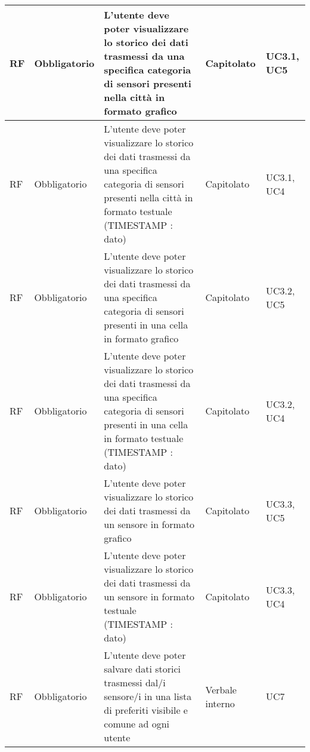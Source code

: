 \begin{longtable}{|C{1cm}|C{2cm}|>{\raggedright}m{5cm}|C{2cm}|C{1.5cm}|}
    \hline
     RF & Obbligatorio        & L'utente deve poter visualizzare lo storico dei dati trasmessi da una specifica categoria di sensori presenti nella città in formato grafico                                                                                       & Capitolato      & UC3.1, UC5               \\
    \hline
     RF & Obbligatorio        & L'utente deve poter visualizzare lo storico dei dati trasmessi da una specifica categoria di sensori presenti nella \newline città in formato testuale (TIMESTAMP : dato)                                                          & Capitolato & UC3.1, UC4                   \\
    \hline
     RF & Obbligatorio        & L'utente deve poter visualizzare lo storico dei dati trasmessi da una specifica categoria di sensori presenti in una cella in formato grafico                                                                                      & Capitolato      & UC3.2, UC5             \\
    \hline
     RF & Obbligatorio        & L'utente deve poter visualizzare lo storico dei dati trasmessi da una specifica categoria di sensori presenti in \newline una cella in formato testuale (TIMESTAMP : dato)                                                         & Capitolato & UC3.2, UC4                \\
    \hline
     RF & Obbligatorio        & L'utente deve poter visualizzare lo storico dei dati trasmessi da un sensore in formato grafico                                                                                                                                    & Capitolato & UC3.3, UC5                 \\
    \hline
     RF & Obbligatorio        & L'utente deve poter visualizzare lo storico dei dati trasmessi da un sensore in formato testuale (TIMESTAMP : dato)                                                                                                                & Capitolato & UC3.3, UC4            \\
    \hline
     RF & Obbligatorio        & L'utente deve poter salvare dati storici trasmessi dal/i sensore/i in una lista di preferiti visibile e comune ad ogni utente                                & Verbale interno & UC7               \\

\end{longtable}
